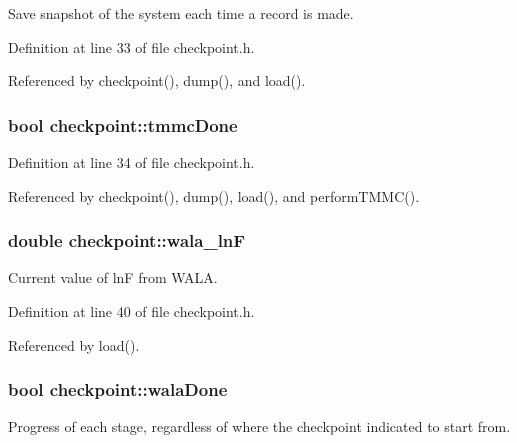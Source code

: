 Save snapshot of the system each time a record is made. 



Definition at line 33 of file checkpoint.\-h.



Referenced by checkpoint(), dump(), and load().

\hypertarget{classcheckpoint_acbe0c62aa82735741a9f396827966823}{
\subsubsection[{tmmc\-Done}]{\setlength{\rightskip}{0pt plus 5cm}bool checkpoint\-::tmmc\-Done}}\label{classcheckpoint_acbe0c62aa82735741a9f396827966823}


Definition at line 34 of file checkpoint.\-h.



Referenced by checkpoint(), dump(), load(), and perform\-T\-M\-M\-C().

\hypertarget{classcheckpoint_a34dc9c1711a8b4f9986a7a2c41b9dcd1}{
\subsubsection[{wala\-\_\-ln\-F}]{\setlength{\rightskip}{0pt plus 5cm}double checkpoint\-::wala\-\_\-ln\-F}}\label{classcheckpoint_a34dc9c1711a8b4f9986a7a2c41b9dcd1}


Current value of ln\-F from W\-A\-L\-A. 



Definition at line 40 of file checkpoint.\-h.



Referenced by load().

\hypertarget{classcheckpoint_aab066479e2ca6656d0031dd46a2fc1a5}{
\subsubsection[{wala\-Done}]{\setlength{\rightskip}{0pt plus 5cm}bool checkpoint\-::wala\-Done}}\label{classcheckpoint_aab066479e2ca6656d0031dd46a2fc1a5}


Progress of each stage, regardless of where the checkpoint indicated to start from. 




